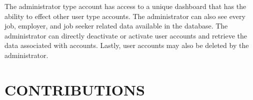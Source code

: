\documentclass[11pt]{article}
\begin{document}
The administrator type account has access to a unique dashboard that has the ability to effect other user type accounts. The administrator can also see every job, employer, and job seeker related data available in the database. The administrator can directly deactivate or activate user accounts and retrieve the data associated with accounts. Lastly, user accounts may also be deleted by the administrator.

\section{CONTRIBUTIONS}

\end{document}
